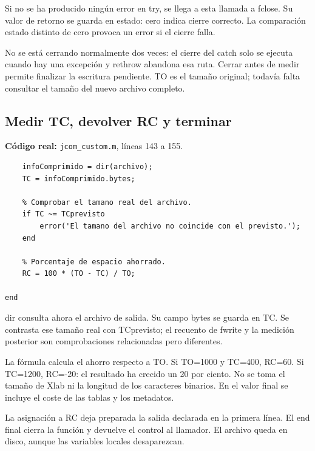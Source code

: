 \documentclass[11pt,a4paper,oneside]{report}
\begin{document}
Si no se ha producido ningún error en try, se llega a esta llamada a fclose.
Su valor de retorno se guarda en estado: cero indica cierre correcto.
La comparación estado distinto de cero provoca un error si el cierre falla.

No se está cerrando normalmente dos veces: el cierre del catch solo se
ejecuta cuando hay una excepción y rethrow abandona esa ruta. Cerrar antes
de medir permite finalizar la escritura pendiente. TO es el tamaño original;
todavía falta consultar el tamaño del nuevo archivo completo.


\par\medskip\noindent\begin{minipage}{\linewidth}

\subsection{Medir TC, devolver RC y terminar}

\textbf{Código real:} \texttt{jcom\_custom.m}, líneas 143 a 155.

\begin{lstlisting}[firstnumber=143]
    % PASO 10: medir el archivo comprimido y calcular RC.
    infoComprimido = dir(archivo);
    TC = infoComprimido.bytes;

    % Comprobar el tamano real del archivo.
    if TC ~= TCprevisto
        error('El tamano del archivo no coincide con el previsto.');
    end

    % Porcentaje de espacio ahorrado.
    RC = 100 * (TO - TC) / TO;

end
\end{lstlisting}

\end{minipage}\par


dir consulta ahora el archivo de salida. Su campo bytes se guarda en TC.
Se contrasta ese tamaño real con TCprevisto; el recuento de fwrite y la
medición posterior son comprobaciones relacionadas pero diferentes.

La fórmula calcula el ahorro respecto a TO. Si TO=1000 y TC=400,
RC=60. Si TC=1200, RC=-20: el resultado ha crecido un 20 por ciento.
No se toma el tamaño de Xlab ni la longitud de los caracteres binarios.
En el valor final se incluye el coste de las tablas y los metadatos.

La asignación a RC deja preparada la salida declarada en la primera línea.
El end final cierra la función y devuelve el control al llamador. El archivo
queda en disco, aunque las variables locales desaparezcan.
\end{document}

